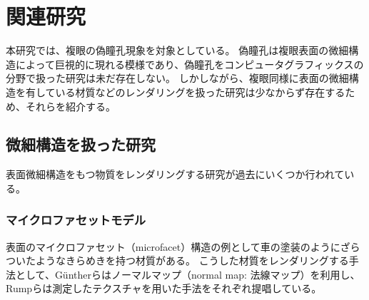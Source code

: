 \chapter{関連研究}
\label{CRelatedWork}

本研究では、複眼の偽瞳孔現象を対象としている。
偽瞳孔は複眼表面の微細構造によって巨視的に現れる模様であり、偽瞳孔をコンピュータグラフィックスの分野で扱った研究は未だ存在しない。
しかしながら、複眼同様に表面の微細構造を有している材質などのレンダリングを扱った研究は少なからず存在するため、それらを紹介する。

\section{微細構造を扱った研究}
\label{SMicrostructure}

表面微細構造をもつ物質をレンダリングする研究が過去にいくつか行われている。

\subsection{マイクロファセットモデル}

表面のマイクロファセット（microfacet）構造の例として車の塗装のようにざらついたようなきらめきを持つ材質がある。
こうした材質をレンダリングする手法として、G\"{u}ntherら\cite{}はノーマルマップ（normal map: 法線マップ）を利用し、Rumpら\cite{rump-2008-photo-realistic}は測定したテクスチャを用いた手法をそれぞれ提唱している。



